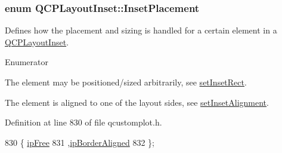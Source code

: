 \subsubsection[{Inset\+Placement}]{\setlength{\rightskip}{0pt plus 5cm}enum {\bf Q\+C\+P\+Layout\+Inset\+::\+Inset\+Placement}}\label{class_q_c_p_layout_inset_a8b9e17d9a2768293d2a7d72f5e298192}
Defines how the placement and sizing is handled for a certain element in a \hyperlink{class_q_c_p_layout_inset}{Q\+C\+P\+Layout\+Inset}. \begin{Desc}
\item[Enumerator]\par
\begin{description}
\item[{\em 
\hypertarget{class_q_c_p_layout_inset_a8b9e17d9a2768293d2a7d72f5e298192aa4802986ea2cea457f932b115acba59e}{}ip\+Free\label{class_q_c_p_layout_inset_a8b9e17d9a2768293d2a7d72f5e298192aa4802986ea2cea457f932b115acba59e}
}]The element may be positioned/sized arbitrarily, see \hyperlink{class_q_c_p_layout_inset_aa487c8378a6f9533567a2e6430099dc3}{set\+Inset\+Rect}. \item[{\em 
\hypertarget{class_q_c_p_layout_inset_a8b9e17d9a2768293d2a7d72f5e298192aa81e7df4a785ddee2229a8f47c46e817}{}ip\+Border\+Aligned\label{class_q_c_p_layout_inset_a8b9e17d9a2768293d2a7d72f5e298192aa81e7df4a785ddee2229a8f47c46e817}
}]The element is aligned to one of the layout sides, see \hyperlink{class_q_c_p_layout_inset_a62882a4f9ad58bb0f53da12fde022abe}{set\+Inset\+Alignment}. \end{description}
\end{Desc}


Definition at line 830 of file qcustomplot.\+h.


\begin{DoxyCode}
830                       \{ \hyperlink{class_q_c_p_layout_inset_a8b9e17d9a2768293d2a7d72f5e298192aa4802986ea2cea457f932b115acba59e}{ipFree}            
831                         ,\hyperlink{class_q_c_p_layout_inset_a8b9e17d9a2768293d2a7d72f5e298192aa81e7df4a785ddee2229a8f47c46e817}{ipBorderAligned}  
832                       \};
\end{DoxyCode}


